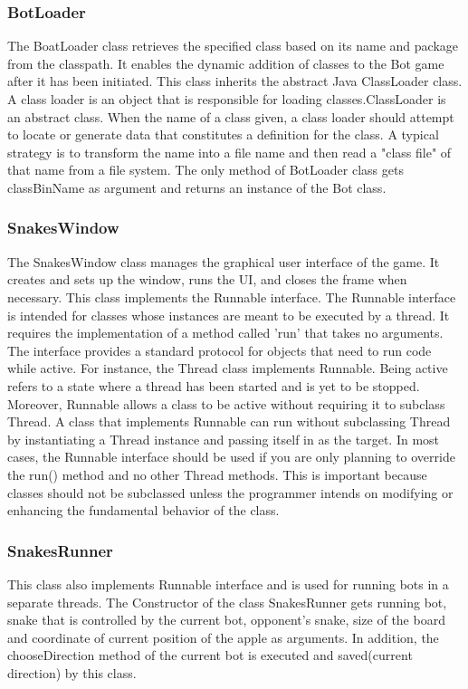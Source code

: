 \documentclass[a4paper,12pt]{article}
\begin{document}
\subsubsection{BotLoader}
The BoatLoader class retrieves the specified class based on its name and package from the classpath.
It enables the dynamic addition of classes to the Bot game after it has been initiated. This class inherits the abstract Java ClassLoader class.\\
A class loader is an object that is responsible for loading classes.ClassLoader is an abstract class.
When the name of a class given, a class loader should attempt to locate or generate data that constitutes a definition for the class. 
A typical strategy is to transform the name into a file name and then read a "class file" of that name from a file system.\cite{classLoader}
The only method of BotLoader class gets classBinName as argument and returns an instance of the Bot class.

\subsubsection{SnakesWindow}
The SnakesWindow class manages the graphical user interface of the game. It creates and sets up the window, runs the UI, and closes the frame when necessary. This class implements the Runnable interface.
The Runnable interface is intended for classes whose instances are meant to be executed by a thread. 
It requires the implementation of a method called 'run' that takes no arguments. The interface provides a standard protocol for objects that need to run code while active. For instance, the Thread class implements Runnable.
Being active refers to a state where a thread has been started and is yet to be stopped.\\
Moreover, Runnable allows a class to be active without requiring it to subclass Thread. A class that implements Runnable can run without subclassing Thread by instantiating a 
Thread instance and passing itself in as the target. In most cases, the Runnable interface should be used if you are only planning to override the run() method and no other Thread methods. This is important because classes should not be subclassed unless the programmer intends on modifying or enhancing the fundamental behavior of the class.\cite{runnable}
\subsubsection{SnakesRunner}
This class also implements Runnable interface and is used for running bots in a separate threads.
The Constructor of the class SnakesRunner gets running bot, snake that is controlled by the current bot,
opponent's snake, size of the board and coordinate of current position of the apple as arguments.
In addition, the chooseDirection method of the current bot is executed and saved(current direction) by this class. 
\end{document}
